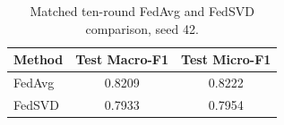 \begin{table}[t]
\centering
\caption{Matched ten-round FedAvg and FedSVD comparison, seed 42.}
\label{tab:matched_fedavg_fedsvd_seed42}
\begin{tabular}{lcc}
\hline
Method & Test Macro-F1 & Test Micro-F1 \\
\hline
FedAvg & 0.8209 & 0.8222 \\
FedSVD & 0.7933 & 0.7954 \\
\hline
\end{tabular}
\end{table}
